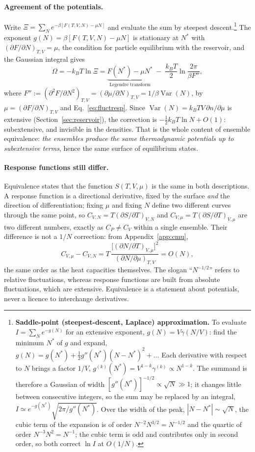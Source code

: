 \documentclass[10pt,a4paper]{article}
\theoremstyle{remark}
\newcommand{\Var}{\operatorname{Var}}
\begin{document}
\paragraph{Agreement of the potentials.} Write
$\Xi=\sum_Ne^{-\beta[F(T,V,N)-\mu N]}$ and evaluate the sum by steepest
descent.\footnote{\textbf{Saddle-point (steepest-descent, Laplace)
approximation.} To evaluate $I=\sum_Ne^{-g(N)}$ for an extensive exponent,
$g(N)=V\gamma(N/V)$: find the minimum $N^\ast$ of $g$ and expand,
$g(N)=g(N^\ast)+\tfrac12g''(N^\ast)(N-N^\ast)^{2}+\dots$ Each derivative with
respect to $N$ brings a factor $1/V$,
$g^{(k)}(N^\ast)=V^{1-k}\gamma^{(k)}\propto N^{1-k}$. The summand is therefore
a Gaussian of width $[g''(N^\ast)]^{-1/2}\propto\sqrt N\gg1$; it changes little
between consecutive integers, so the sum may be replaced by an integral,
$I\simeq e^{-g(N^\ast)}\sqrt{2\pi/g''(N^\ast)}$. Over the width of the peak,
$|N-N^\ast|\sim\sqrt N$, the cubic term of the expansion is of order
$N^{-2}N^{3/2}=N^{-1/2}$ and the quartic of order $N^{-3}N^{2}=N^{-1}$; the
cubic term is odd and contributes only in second order, so both correct
$\ln I$ at $O(1/N)$.} The exponent $g(N)=\beta[F(T,V,N)-\mu N]$ is stationary
at $N^\ast$ with $(\partial F/\partial N)_{T,V}=\mu$, the condition for
particle equilibrium with the reservoir, and the Gaussian integral gives
\[
  \Omega=-k_BT\ln\Xi
  =\underbrace{F(N^\ast)-\mu N^\ast}_{\text{Legendre transform}}
  \;-\;\frac{k_BT}{2}\ln\frac{2\pi}{\beta F''} ,
\]
where $F'':=(\partial^{2}F/\partial N^{2})_{T,V}=(\partial\mu/\partial N)_{T,V}=1/\beta\Var(N)$,
by $\mu=(\partial F/\partial N)_{T,V}$ and Eq.~\eqref{eq:fluctresp}.
Since $\Var(N)=k_BTV\,\partial n/\partial\mu$ is
extensive (Section~\ref{sec:reservoir}), the correction is $-\tfrac12k_BT\ln N+O(1)$: subextensive,
and invisible in the densities. That is the whole content of ensemble
equivalence: \emph{the ensembles produce the same thermodynamic potentials up
to subextensive terms}, hence the same surface of equilibrium states.

\paragraph{Response functions still differ.}
\label{sec:respdiffer}
Equivalence states that the function $S(T,V,\mu)$ is the same in both
descriptions. A response function is a directional derivative, fixed by the
surface \emph{and} the direction of differentiation; fixing $\mu$ and fixing
$N$ define two different curves through the same point, so
$C_{V,N}=T(\partial S/\partial T)_{V,N}$ and $C_{V,\mu}=T(\partial S/\partial T)_{V,\mu}$
are two different numbers, exactly as $C_P\neq C_V$ within a single ensemble.
Their difference is not a $1/N$ correction: from Appendix~\ref{app:cmu},
\[
  C_{V,\mu}-C_{V,N}=T\,\frac{\big[(\partial N/\partial T)_{V,\mu}\big]^{2}}
  {(\partial N/\partial\mu)_{T,V}}=O(N) ,
\]
the same order as the heat capacities themselves. The slogan ``$N^{-1/2}$''
refers to relative fluctuations, whereas response functions are built from
absolute fluctuations, which are extensive. Equivalence is a statement about
potentials, never a licence to interchange derivatives.
\end{document}
